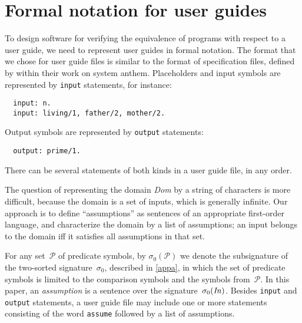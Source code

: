 \documentclass{tlp}
\def\anthem{{\sc anthem}}
\newcommand{\PP}{\mathcal{P}}
\begin{document}
\section{Formal notation for user guides} \label{sec:fn}

To design software for verifying the equivalence of
programs with respect to a user guide, we need to
represent user guides in formal notation.   The format that we chose for
user guide files is similar to the format of
specification files, defined by \cite{fan20} within their work on system \anthem.
Placeholders
and input symbols are represented by \verb|input| statements, for instance:
\begin{verbatim}
  input: n.
  input: living/1, father/2, mother/2.
\end{verbatim}
Output symbols are represented by \verb|output| statements:
\begin{verbatim}
  output: prime/1.
\end{verbatim}
There can be several statements of both kinds in a user guide file, in any
order.

The question of representing the domain \emph{Dom} by a string of
characters is more difficult, because the domain is a set of inputs,
which is generally infinite.
Our approach is to define ``assumptions'' as sentences of an
appropriate first-order language, and characterize the domain by a
list of assumptions; an input belongs to the domain iff it
satisfies all assumptions in that set.

For any set~$\PP$ of predicate symbols, by $\sigma_0(\PP)$ we denote the
subsignature of the two-sorted signature~$\sigma_0$, described in \ref{appa},
in which the set of predicate symbols
is limited to the comparison symbols and the symbols from~$\PP$.
In this paper, an \emph{assumption} is a sentence over the
signature~$\sigma_0(\emph{In\/})$.
Besides \verb|input| and \verb|output| statements, a user guide
file may include one or more statements consisting of the word
\verb|assume| followed by a list of assumptions.
\end{document}
